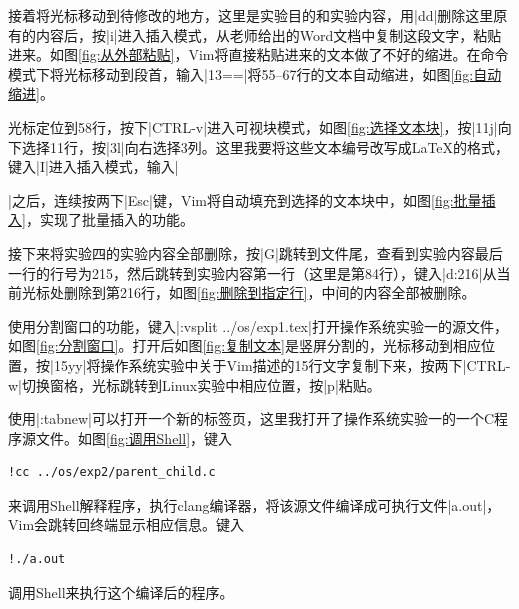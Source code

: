 \documentclass[cs4size,a4paper,nofonts]{ctexart}
\begin{document}
接着将光标移动到待修改的地方，这里是实验目的和实验内容，用|dd|删除这里原有的内容后，按|i|进入插入模式，从老师给出的Word文档中复制这段文字，粘贴进来。如图\ref{fig:从外部粘贴}，Vim将直接粘贴进来的文本做了不好的缩进。在命令模式下将光标移动到段首，输入|13==|将55--67行的文本自动缩进，如图\ref{fig:自动缩进}。

\begin{figure}[htp]
\end{figure}

光标定位到58行，按下|CTRL-v|进入可视块模式，如图\ref{fig:选择文本块}，按|11j|向下选择11行，按|3l|向右选择3列。这里我要将这些文本编号改写成\LaTeX 的格式，键入|I|进入插入模式，输入|\item |之后，连续按两下|Esc|键，Vim将自动填充到选择的文本块中，如图\ref{fig:批量插入}，实现了批量插入的功能。

\begin{figure}[htp]
\end{figure}

\begin{figure}[htp]
\end{figure}

接下来将实验四的实验内容全部删除，按|G|跳转到文件尾，查看到实验内容最后一行的行号为215，然后跳转到实验内容第一行（这里是第84行），键入|d:216|从当前光标处删除到第216行，如图\ref{fig:删除到指定行}，中间的内容全部被删除。

使用分割窗口的功能，键入|:vsplit ../os/exp1.tex|打开操作系统实验一的源文件，如图\ref{fig:分割窗口}。打开后如图\ref{fig:复制文本}是竖屏分割的，光标移动到相应位置，按|15yy|将操作系统实验中关于Vim描述的15行文字复制下来，按两下|CTRL-w|切换窗格，光标跳转到Linux实验中相应位置，按|p|粘贴。

使用|:tabnew|可以打开一个新的标签页，这里我打开了操作系统实验一的一个C程序源文件。如图\ref{fig:调用Shell}，键入
\begin{Verbatim}
!cc ../os/exp2/parent_child.c
\end{Verbatim}
来调用Shell解释程序，执行clang编译器，将该源文件编译成可执行文件|a.out|，Vim会跳转回终端显示相应信息。键入
\begin{Verbatim}
!./a.out
\end{Verbatim}
调用Shell来执行这个编译后的程序。

\begin{figure}[htp]
\end{figure}
\end{document}
